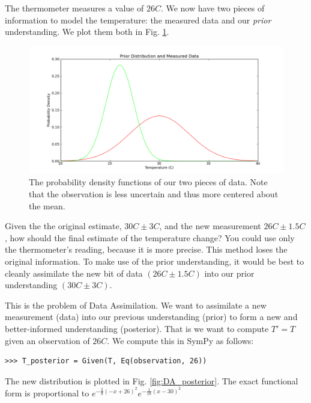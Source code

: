 The thermometer measures a value of $26C$. We now have two pieces of
information to model the temperature: the measured data and our \textit{prior}
understanding. We plot them both in Fig. \ref{fig:DA_data}.

\begin{figure}[ht]
\vspace{-0pt}
\centering
\includegraphics[width=.7\textwidth]{images/data.png}
\vspace{-0pt}
\caption{The probability density functions of our two pieces of data. Note that the observation is less uncertain and thus more centered about the mean.}
\label{fig:DA_data}
\vspace{00pt}
\end{figure}

Given the the original estimate, $30C \pm 3C$, and the new measurement $26C \pm
1.5C$, how should the final estimate of the temperature change?  You could use
only the thermometer's reading, because it is more precise. This method loses
the original information. To make use of the prior understanding, it would be best
to cleanly assimilate the new bit of data $(26C \pm 1.5C)$ into our prior
understanding $(30C \pm 3C)$.

This is the problem of Data Assimilation. We want to assimilate a new
measurement (data) into our previous understanding (prior) to form a new and
better-informed understanding (posterior). That is we want to compute $T' = T$
given an observation of $26C$. We compute this in SymPy as follows:

\begin{lstlisting}
>>> T_posterior = Given(T, Eq(observation, 26))
\end{lstlisting}

The new distribution is plotted in Fig. \ref{fig:DA_posterior}. The exact
functional form is proportional to $e^{-\frac{2}{9} \left(-x + 26\right)^{2}}
e^{-\frac{1}{18} \left(x-30\right)^{2}}$

